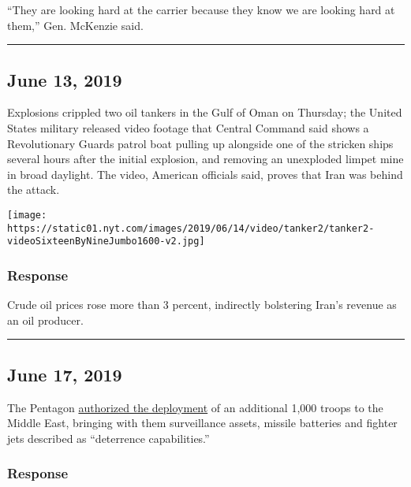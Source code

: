 ``They are looking hard at the carrier because they know we are looking
hard at them,'' Gen. McKenzie said.

\begin{center}\rule{0.5\linewidth}{\linethickness}\end{center}

\hypertarget{june-13-2019}{%
\subsection{June 13, 2019}\label{june-13-2019}}

Explosions crippled two oil tankers in the Gulf of Oman on Thursday; the
United States military released video footage that Central Command said
shows a Revolutionary Guards patrol boat pulling up alongside one of the
stricken ships several hours after the initial explosion, and removing
an unexploded limpet mine in broad daylight. The video, American
officials said, proves that Iran was behind the attack.

\texttt{[image: https://static01.nyt.com/images/2019/06/14/video/tanker2/tanker2-videoSixteenByNineJumbo1600-v2.jpg]}

\hypertarget{response-5}{%
\subsubsection{\texorpdfstring{\textbf{Response}}{Response}}\label{response-5}}

Crude oil prices rose more than 3 percent, indirectly bolstering Iran's
revenue as an oil producer.

\begin{center}\rule{0.5\linewidth}{\linethickness}\end{center}

\hypertarget{june-17-2019}{%
\subsection{June 17, 2019}\label{june-17-2019}}

The Pentagon
\href{https://www.nytimes.com/2019/06/17/world/middleeast/iran-nuclear-deal-compliance.html}{authorized
the deployment} of an additional 1,000 troops to the Middle East,
bringing with them surveillance assets, missile batteries and fighter
jets described as ``deterrence capabilities.''

\hypertarget{response-6}{%
\subsubsection{Response}\label{response-6}}

